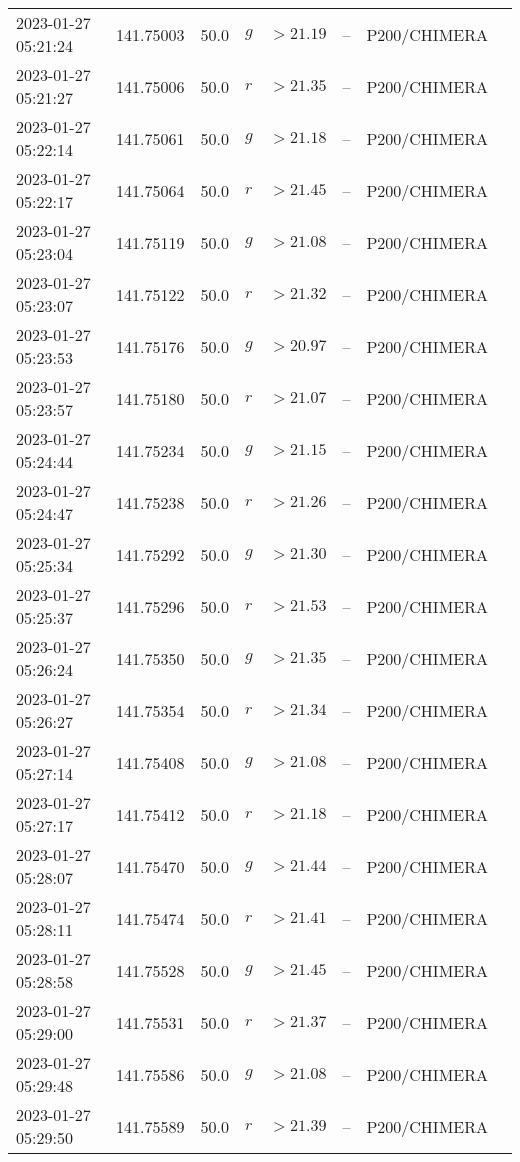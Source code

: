 \documentclass{nature_plusfigure}
\begin{document}
\begin{supplement}
\begin{center}
\begin{longtable}{llllllll}
2023-01-27 05:21:24 & 141.75003 & 50.0 & $g$ & $>21.19$ & -- & P200/CHIMERA &  \\ 
2023-01-27 05:21:27 & 141.75006 & 50.0 & $r$ & $>21.35$ & -- & P200/CHIMERA &  \\ 
2023-01-27 05:22:14 & 141.75061 & 50.0 & $g$ & $>21.18$ & -- & P200/CHIMERA &  \\ 
2023-01-27 05:22:17 & 141.75064 & 50.0 & $r$ & $>21.45$ & -- & P200/CHIMERA &  \\ 
2023-01-27 05:23:04 & 141.75119 & 50.0 & $g$ & $>21.08$ & -- & P200/CHIMERA &  \\ 
2023-01-27 05:23:07 & 141.75122 & 50.0 & $r$ & $>21.32$ & -- & P200/CHIMERA &  \\ 
2023-01-27 05:23:53 & 141.75176 & 50.0 & $g$ & $>20.97$ & -- & P200/CHIMERA &  \\ 
2023-01-27 05:23:57 & 141.75180 & 50.0 & $r$ & $>21.07$ & -- & P200/CHIMERA &  \\ 
2023-01-27 05:24:44 & 141.75234 & 50.0 & $g$ & $>21.15$ & -- & P200/CHIMERA &  \\ 
2023-01-27 05:24:47 & 141.75238 & 50.0 & $r$ & $>21.26$ & -- & P200/CHIMERA &  \\ 
2023-01-27 05:25:34 & 141.75292 & 50.0 & $g$ & $>21.30$ & -- & P200/CHIMERA &  \\ 
2023-01-27 05:25:37 & 141.75296 & 50.0 & $r$ & $>21.53$ & -- & P200/CHIMERA &  \\ 
2023-01-27 05:26:24 & 141.75350 & 50.0 & $g$ & $>21.35$ & -- & P200/CHIMERA &  \\ 
2023-01-27 05:26:27 & 141.75354 & 50.0 & $r$ & $>21.34$ & -- & P200/CHIMERA &  \\ 
2023-01-27 05:27:14 & 141.75408 & 50.0 & $g$ & $>21.08$ & -- & P200/CHIMERA &  \\ 
2023-01-27 05:27:17 & 141.75412 & 50.0 & $r$ & $>21.18$ & -- & P200/CHIMERA &  \\ 
2023-01-27 05:28:07 & 141.75470 & 50.0 & $g$ & $>21.44$ & -- & P200/CHIMERA &  \\ 
2023-01-27 05:28:11 & 141.75474 & 50.0 & $r$ & $>21.41$ & -- & P200/CHIMERA &  \\ 
2023-01-27 05:28:58 & 141.75528 & 50.0 & $g$ & $>21.45$ & -- & P200/CHIMERA &  \\ 
2023-01-27 05:29:00 & 141.75531 & 50.0 & $r$ & $>21.37$ & -- & P200/CHIMERA &  \\ 
2023-01-27 05:29:48 & 141.75586 & 50.0 & $g$ & $>21.08$ & -- & P200/CHIMERA &  \\ 
2023-01-27 05:29:50 & 141.75589 & 50.0 & $r$ & $>21.39$ & -- & P200/CHIMERA &  \\ 

\end{longtable}
\end{center}
\end{supplement}
\end{document}
